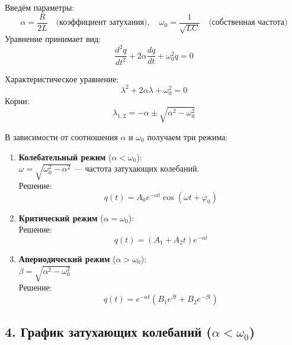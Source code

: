 \documentclass[a4paper]{article}
\begin{document}
Введём параметры:
\[
\alpha = \frac{R}{2L} \quad \text{(коэффициент затухания)}, \quad \omega_0 = \frac{1}{\sqrt{LC}} \quad \text{(собственная частота)}
\]
Уравнение принимает вид:
\[
\frac{d^2 q}{dt^2} + 2\alpha \frac{dq}{dt} + \omega_0^2 q = 0
\]

Характеристическое уравнение:
\[
\lambda^2 + 2\alpha \lambda + \omega_0^2 = 0
\]
Корни:
\[
\lambda_{1,2} = -\alpha \pm \sqrt{\alpha^2 - \omega_0^2}
\]

В зависимости от соотношения $\alpha$ и $\omega_0$ получаем три режима:

\begin{enumerate}
    \item \textbf{Колебательный режим} ($\alpha < \omega_0$): \\
    $\omega = \sqrt{\omega_0^2 - \alpha^2}$ — частота затухающих колебаний. \\
    Решение: 
    \[
    q(t) = A_0 e^{-\alpha t} \cos(\omega t + \varphi_0)
    \]
    \item \textbf{Критический режим} ($\alpha = \omega_0$): \\
    Решение:
    \[
    q(t) = (A_1 + A_2 t) e^{-\alpha t}
    \]
    \item \textbf{Апериодический режим} ($\alpha > \omega_0$): \\
    $\beta = \sqrt{\alpha^2 - \omega_0^2}$ \\
    Решение:
    \[
    q(t) = e^{-\alpha t} \left( B_1 e^{\beta t} + B_2 e^{-\beta t} \right)
    \]
\end{enumerate}

\subsection*{4. График затухающих колебаний ($\alpha < \omega_0$)}

\begin{center}
\end{center}
\end{document}
